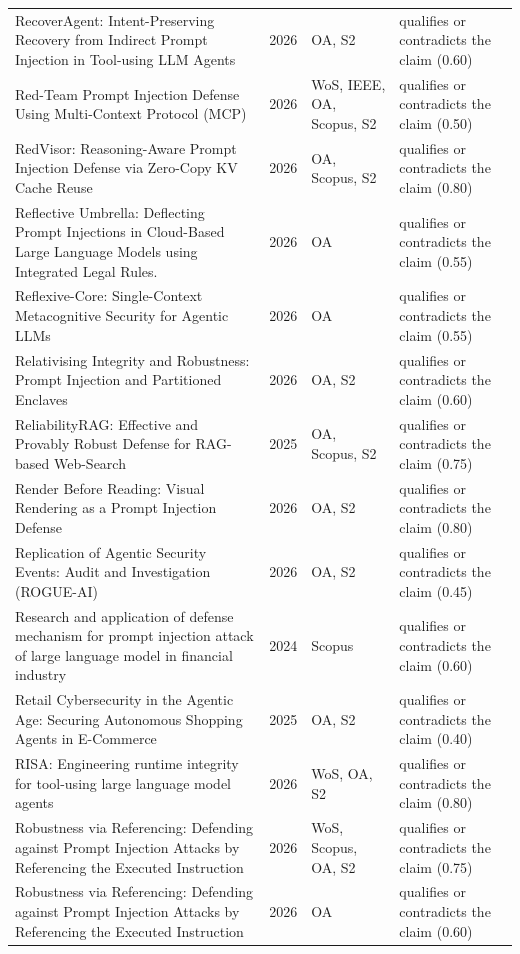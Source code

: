 \begin{longtable}{@{}%
  >{\raggedright\arraybackslash}p{}c%
  >{\raggedright\arraybackslash}p{}%
  >{\raggedright\arraybackslash}p{}@{}}
RecoverAgent: Intent-Preserving Recovery from Indirect Prompt Injection in Tool-using LLM Agents & 2026 & OA, S2 & qualifies or contradicts the claim (0.60) \\
Red-Team Prompt Injection Defense Using Multi-Context Protocol (MCP) & 2026 & WoS, IEEE, OA, Scopus, S2 & qualifies or contradicts the claim (0.50) \\
RedVisor: Reasoning-Aware Prompt Injection Defense via Zero-Copy KV Cache Reuse & 2026 & OA, Scopus, S2 & qualifies or contradicts the claim (0.80) \\
Reflective Umbrella: Deflecting Prompt Injections in Cloud-Based Large Language Models using Integrated Legal Rules. & 2026 & OA & qualifies or contradicts the claim (0.55) \\
Reflexive-Core: Single-Context Metacognitive Security for Agentic LLMs & 2026 & OA & qualifies or contradicts the claim (0.55) \\
Relativising Integrity and Robustness: Prompt Injection and Partitioned Enclaves & 2026 & OA, S2 & qualifies or contradicts the claim (0.60) \\
ReliabilityRAG: Effective and Provably Robust Defense for RAG-based Web-Search & 2025 & OA, Scopus, S2 & qualifies or contradicts the claim (0.75) \\
Render Before Reading: Visual Rendering as a Prompt Injection Defense & 2026 & OA, S2 & qualifies or contradicts the claim (0.80) \\
Replication of Agentic Security Events: Audit and Investigation (ROGUE-AI) & 2026 & OA, S2 & qualifies or contradicts the claim (0.45) \\
Research and application of defense mechanism for prompt injection attack of large language model in financial industry & 2024 & Scopus & qualifies or contradicts the claim (0.60) \\
Retail Cybersecurity in the Agentic Age: Securing Autonomous Shopping Agents in E-Commerce & 2025 & OA, S2 & qualifies or contradicts the claim (0.40) \\
RISA: Engineering runtime integrity for tool-using large language model agents & 2026 & WoS, OA, S2 & qualifies or contradicts the claim (0.80) \\
Robustness via Referencing: Defending against Prompt Injection Attacks by Referencing the Executed Instruction & 2026 & WoS, Scopus, OA, S2 & qualifies or contradicts the claim (0.75) \\
Robustness via Referencing: Defending against Prompt Injection Attacks by Referencing the Executed Instruction & 2026 & OA & qualifies or contradicts the claim (0.60) \\

\end{longtable}

